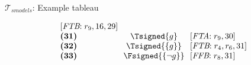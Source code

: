 \begin{frame}{$\mathcal{T}_{\textit{smodels}}$: Example tableau}
\begin{center}
\begin{minipage}[t]{16cm}
\begin{minipage}[t]{6cm}
\begin{minipage}[t]{2cm}
\[\begin{array}{l@{~~}c@{~~}l}
  [\textit{FTB}{:}\;r_9, \text{16}, \text{29}]     \\
\textbf{(31)}                                      &
  \Tsigned{g}                                      &
  [\textit{FTA}{:}\;r_9, \text{30}]                \\
\textbf{(32)}                                      &
  \Tsigned{\{g\}}                                  &
  [\textit{FTB}{:}\;r_4, r_6, \text{31}]           \\
\textbf{(33)}                                      &
  \Fsigned{\{\neg g\}}                     &
  [\textit{FFB}{:}\;r_8, \text{31}]
\end{array}
\]
\end{minipage}
\end{minipage}
\end{minipage}
\end{center}
\bigskip
\end{frame}
